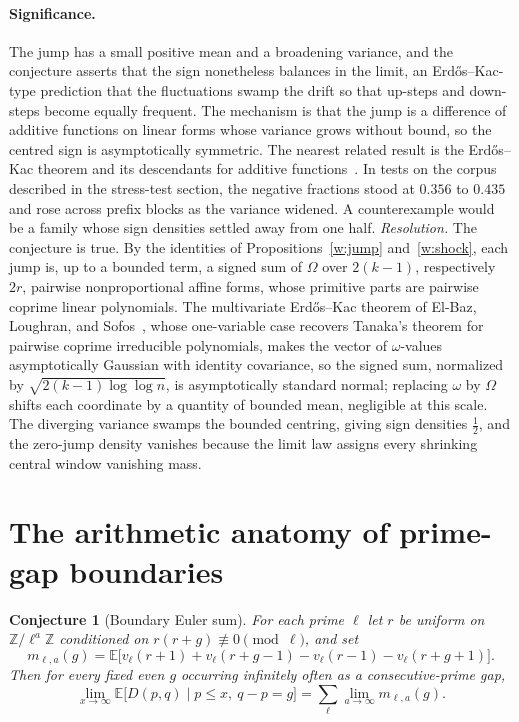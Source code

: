 \documentclass[11pt]{article}
\newtheorem{conjecture}{Conjecture}
\theoremstyle{definition}
\newcommand{\Z}{\mathbb Z}
\providecommand{\Z}{\mathbb Z}
\begin{document}
\paragraph{Significance.}
The jump has a small positive mean and a broadening variance, and the conjecture asserts that the sign nonetheless balances in the limit, an Erd\H{o}s--Kac-type prediction that the fluctuations swamp the drift so that up-steps and down-steps become equally frequent.  The mechanism is that the jump is a difference of additive functions on linear forms whose variance grows without bound, so the centred sign is asymptotically symmetric.  The nearest related result is the Erd\H{o}s--Kac theorem and its descendants for additive functions~\cite{Ten}.  In tests on the corpus described in the stress-test section, the negative fractions stood at $0.356$ to $0.435$ and rose across prefix blocks as the variance widened.  A counterexample would be a family whose sign densities settled away from one half.  \emph{Resolution.} The conjecture is true.  By the identities of Propositions~\ref{w:jump} and~\ref{w:shock}, each jump is, up to a bounded term, a signed sum of $\Omega$ over $2(k-1)$, respectively $2r$, pairwise nonproportional affine forms, whose primitive parts are pairwise coprime linear polynomials.  The multivariate Erd\H{o}s--Kac theorem of El-Baz, Loughran, and Sofos~\cite{ELS22}, whose one-variable case recovers Tanaka's theorem for pairwise coprime irreducible polynomials, makes the vector of $\omega$-values asymptotically Gaussian with identity covariance, so the signed sum, normalized by $\sqrt{2(k-1)\log\log n}$, is asymptotically standard normal; replacing $\omega$ by $\Omega$ shifts each coordinate by a quantity of bounded mean, negligible at this scale.  The diverging variance swamps the bounded centring, giving sign densities $\tfrac12$, and the zero-jump density vanishes because the limit law assigns every shrinking central window vanishing mass.

\section{The arithmetic anatomy of prime-gap boundaries}

\begin{conjecture}[Boundary Euler sum]\label{w20}
For each prime $\ell$ let $r$ be uniform on $\Z/\ell^a\Z$ conditioned on $r(r+g)\not\equiv0\pmod\ell$, and set
\[
m_{\ell,a}(g)=\mathbb E\bigl[v_\ell(r+1)+v_\ell(r+g-1)-v_\ell(r-1)-v_\ell(r+g+1)\bigr].
\]
Then for every fixed even $g$ occurring infinitely often as a consecutive-prime gap,
\[
\lim_{x\to\infty}\mathbb E\bigl[D(p,q)\mid p\le x,\ q-p=g\bigr]=\sum_\ell\lim_{a\to\infty}m_{\ell,a}(g).
\]
\end{conjecture}
\end{document}
